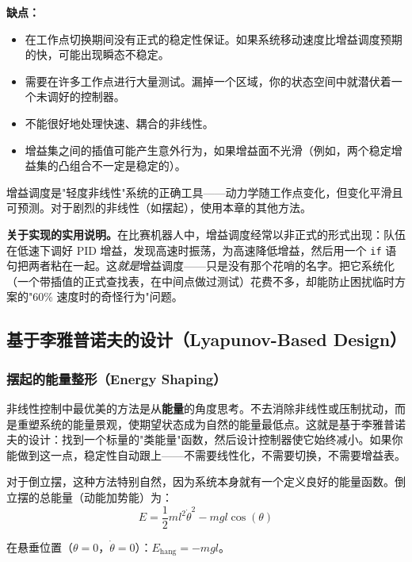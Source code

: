 \textbf{缺点：}
\begin{itemize}[nosep]
    \item 在工作点切换期间没有正式的稳定性保证。如果系统移动速度比增益调度预期的快，可能出现瞬态不稳定。
    \item 需要在许多工作点进行大量测试。漏掉一个区域，你的状态空间中就潜伏着一个未调好的控制器。
    \item 不能很好地处理快速、耦合的非线性。
    \item 增益集之间的插值可能产生意外行为，如果增益面不光滑（例如，两个稳定增益集的凸组合不一定是稳定的）。
\end{itemize}

增益调度是"轻度非线性"系统的正确工具——动力学随工作点变化，但变化平滑且可预测。对于剧烈的非线性（如摆起），使用本章的其他方法。

\textbf{关于实现的实用说明。}在比赛机器人中，增益调度经常以非正式的形式出现：队伍在低速下调好 PID 增益，发现高速时振荡，为高速降低增益，然后用一个 \texttt{if} 语句把两者粘在一起。这\textit{就是}增益调度——只是没有那个花哨的名字。把它系统化（一个带插值的正式查找表，在中间点做过测试）花费不多，却能防止困扰临时方案的"60\% 速度时的奇怪行为"问题。

\subsection{基于李雅普诺夫的设计（Lyapunov-Based Design）}

\subsubsection{摆起的能量整形（Energy Shaping）}

非线性控制中最优美的方法是从\textbf{能量}的角度思考。不去消除非线性或压制扰动，而是重塑系统的能量景观，使期望状态成为自然的能量最低点。这就是基于李雅普诺夫的设计：找到一个标量的"类能量"函数，然后设计控制器使它始终减小。如果你能做到这一点，稳定性自动跟上——不需要线性化，不需要切换，不需要增益表。

对于倒立摆，这种方法特别自然，因为系统本身就有一个定义良好的能量函数。倒立摆的总能量（动能加势能）为：
\begin{equation}
E = \frac{1}{2}ml^2\dot{\theta}^2 - mgl\cos(\theta)
\end{equation}

在悬垂位置（$\theta = 0$，$\dot{\theta} = 0$）：$E_{\text{hang}} = -mgl$。

